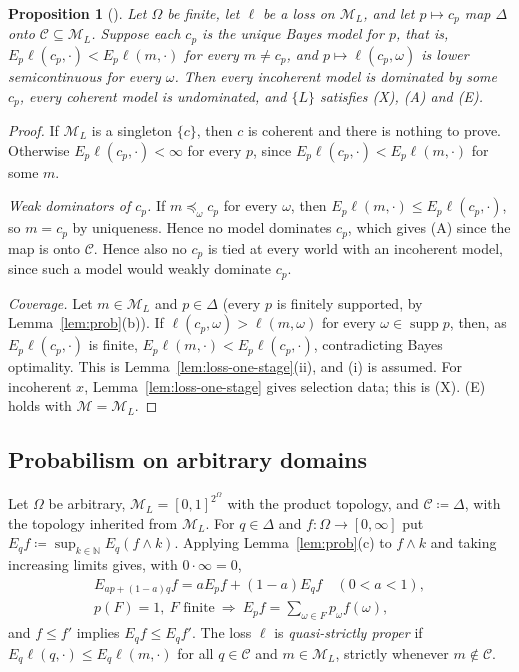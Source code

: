 \documentclass[11pt]{article}
\newtheorem{proposition}[theorem]{Proposition}
\theoremstyle{definition}
\theoremstyle{remark}
\newcommand{\M}{\mathcal M}
\newcommand{\C}{\mathcal C}
\newcommand{\supp}{\operatorname{supp}}
\begin{document}
\begin{proposition}[{\cite{Predd2009,Pettigrew2022}}]\label{prop:proper}
Let $\Omega$ be finite, let $\ell$ be a loss on $\M_L$, and let $p\mapsto c_p$ map $\Delta$ onto $\C\subseteq\M_L$. Suppose each $c_p$ is the unique Bayes model for $p$, that is, $E_p\ell(c_p,\cdot)<E_p\ell(m,\cdot)$ for every $m\ne c_p$, and $p\mapsto\ell(c_p,\omega)$ is lower semicontinuous for every $\omega$. Then every incoherent model is dominated by some $c_p$, every coherent model is undominated, and $\{L\}$ satisfies (X), (A) and (E).
\end{proposition}
\begin{proof}
If $\M_L$ is a singleton $\{c\}$, then $c$ is coherent and there is nothing to prove. Otherwise $E_p\ell(c_p,\cdot)<\infty$ for every $p$, since $E_p\ell(c_p,\cdot)<E_p\ell(m,\cdot)$ for some $m$.

\emph{Weak dominators of $c_p$.} If $m\preceq_\omega c_p$ for every $\omega$, then $E_p\ell(m,\cdot)\le E_p\ell(c_p,\cdot)$, so $m=c_p$ by uniqueness. Hence no model dominates $c_p$, which gives (A) since the map is onto $\C$. Hence also no $c_p$ is tied at every world with an incoherent model, since such a model would weakly dominate $c_p$.

\emph{Coverage.} Let $m\in\M_L$ and $p\in\Delta$ (every $p$ is finitely supported, by Lemma~\ref{lem:prob}(b)). If $\ell(c_p,\omega)>\ell(m,\omega)$ for every $\omega\in\supp p$, then, as $E_p\ell(c_p,\cdot)$ is finite, $E_p\ell(m,\cdot)<E_p\ell(c_p,\cdot)$, contradicting Bayes optimality. This is Lemma~\ref{lem:loss-one-stage}(ii), and (i) is assumed. For incoherent $x$, Lemma~\ref{lem:loss-one-stage} gives selection data; this is (X). (E) holds with $\M=\M_L$.
\end{proof}

\subsection{Probabilism on arbitrary domains}

Let $\Omega$ be arbitrary, $\M_L=[0,1]^{2^\Omega}$ with the product topology, and $\C\coloneqq\Delta$, with the topology inherited from $\M_L$. For $q\in\Delta$ and $f:\Omega\to[0,\infty]$ put $E_qf\coloneqq\sup_{k\in\mathbb N}E_q(f\wedge k)$. Applying Lemma~\ref{lem:prob}(c) to $f\wedge k$ and taking increasing limits gives, with $0\cdot\infty=0$,
\begin{gather*}
E_{ap+(1-a)q}f=aE_pf+(1-a)E_qf\quad(0<a<1),\\
p(F)=1,\ F\text{ finite}\ \Longrightarrow\ E_pf=\textstyle\sum_{\omega\in F}p_\omega f(\omega),
\end{gather*}
and $f\le f'$ implies $E_qf\le E_qf'$. The loss $\ell$ is \emph{quasi-strictly proper} if $E_q\ell(q,\cdot)\le E_q\ell(m,\cdot)$ for all $q\in\C$ and $m\in\M_L$, strictly whenever $m\notin\C$.
\end{document}
